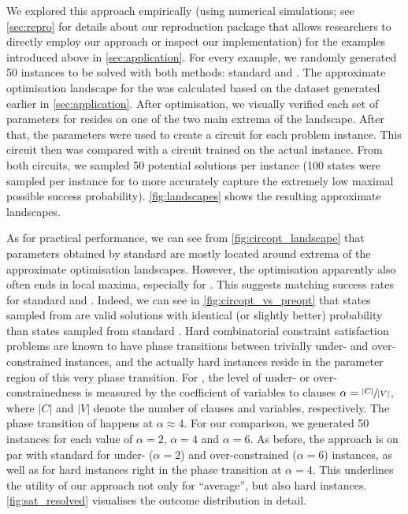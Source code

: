 We explored this approach empirically (using numerical simulations; see \cref{sec:repro} for details about our reproduction package that allows researchers to directly employ our approach or inspect our implementation) for the examples introduced above in \cref{sec:application}. For every example, we randomly generated 50 instances to be solved with both \QAOA methods: standard \QAOA and \ourQAOA. The approximate optimisation landscape for the \ourQAOA was calculated based on the dataset generated earlier in \cref{sec:application}. After  optimisation, we visually verified each set of parameters for \ourQAOA resides on one of the two main extrema of the landscape. After that, the parameters were used to create a \QAOA circuit for each problem instance. This circuit then was compared with a \QAOA circuit trained on the actual instance. From both circuits, we sampled 50 potential solutions per instance (100 states were sampled per instance for \qrfactoring to more accurately capture the extremely low maximal possible success probability). \cref{fig:landscapes} shows the resulting approximate landscapes. 


As for practical performance, we can see from \cref{fig:circopt_landscape} that parameters obtained by standard \QAOA are mostly located around extrema of the approximate optimisation landscapes. However, the optimisation apparently also often ends in local maxima, especially for \qrfactoring. This suggests matching success rates for standard and \ourQAOA. Indeed, we can see in \cref{fig:circopt_vs_preopt} that states sampled from \ourQAOA are valid solutions with identical (or slightly better) probability than states sampled from standard \QAOA. 
Hard combinatorial constraint satisfaction problems are known to have phase transitions between trivially under- and over-constrained instances, and the actually hard instances reside in the parameter region of this very phase transition. For \SAT, the level of under- or over-constrainedness is measured by the coefficient of variables to clauses $\alpha = \sfrac{|C|}{|V|}$, where $|C|$ and $|V|$ denote the number of clauses and variables, respectively. The phase transition of \SAT happens at $\alpha \approx 4$. For our comparison, we generated 50 instances for each value of $\alpha = 2$, $\alpha = 4$ and $\alpha = 6$. As before, the \ourQAOA approach is on par with standard \QAOA for under- ($\alpha = 2$) and over-constrained ($\alpha = 6$) \SAT instances, as well as for hard \SAT instances right in the phase transition at $\alpha = 4$. This underlines the utility of our approach not only for \enquote{average}, but also hard instances. \cref{fig:sat_resolved} visualises the outcome distribution in detail.

